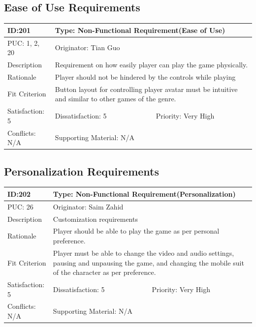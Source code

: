 \documentclass{article}
\begin{document}
	\subsection{Ease of Use Requirements}
	\begin{table}[H]
		\begin{tabular}{|l|l|l|}
			\hline
			ID:201 & \multicolumn{2}{l|}{Type: Non-Functional Requirement(Ease of Use)} \\ \hline
			PUC: 1, 2, 20 & \multicolumn{2}{l|}{Originator: Tian Guo} \\ \hline
			Description & \multicolumn{2}{m{0.85\textwidth}|}{Requirement on how easily player can play the game physically.} \\ \hline
			Rationale & \multicolumn{2}{m{0.85\textwidth}|}{Player should not be hindered by the controls while playing} \\ \hline
			Fit Criterion & \multicolumn{2}{m{0.85\textwidth}|}{Button layout for controlling player avatar must be intuitive and similar to other games of the genre.} \\ \hline
			Satisfaction: 5 & Dissatisfaction: 5 & Priority: Very High \\ \hline
			Conflicts: N/A & \multicolumn{2}{l|}{Supporting Material: N/A} \\ \hline
		\end{tabular}
	\end{table}

	\subsection{Personalization Requirements}
	\begin{table}[H]
		\begin{tabular}{|l|l|l|}
			\hline
			ID:202 & \multicolumn{2}{l|}{Type: Non-Functional Requirement(Personalization)} \\ \hline
			PUC: 26 & \multicolumn{2}{l|}{Originator: Saim Zahid} \\ \hline
			Description & \multicolumn{2}{m{0.85\textwidth}|}{Customization requirements} \\ \hline
			Rationale & \multicolumn{2}{m{0.85\textwidth}|}{Player should be able to play the game as per personal preference.} \\ \hline
			Fit Criterion & \multicolumn{2}{m{0.85\textwidth}|}{Player must be able to change the video and audio settings, pausing and unpausing the game, and changing the mobile suit of the character as per preference.} \\ \hline
			Satisfaction: 5 & Dissatisfaction: 5 & Priority: Very High \\ \hline
			Conflicts: N/A & \multicolumn{2}{l|}{Supporting Material: N/A} \\ \hline
		\end{tabular}
	\end{table}
\end{document}
